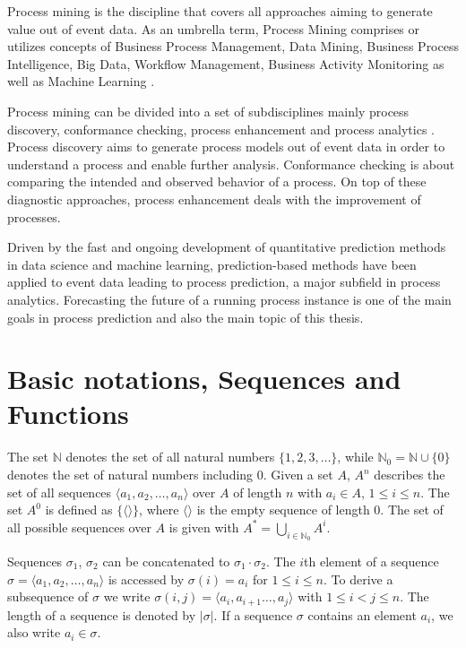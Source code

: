 Process mining is the discipline that covers all approaches aiming to generate value out of event data.
As an umbrella term, Process Mining comprises or utilizes concepts of Business Process Management, Data Mining, Business Process Intelligence, Big Data, Workflow Management, Business Activity Monitoring \cite{DBLP:books/sp/Aalst16} as well as Machine Learning \cite{DBLP:conf/bpm/VeitGMHT17}.

Process mining can be divided into a set of subdisciplines mainly process discovery, conformance checking, process enhancement and process analytics \cite{DBLP:conf/caise/EckLLA15}.
Process discovery aims to generate process models out of event data in order to understand a process and enable further analysis.
Conformance checking is about comparing the intended and observed behavior of a process. 
On top of these diagnostic approaches, process enhancement deals with the improvement of processes.

Driven by the fast and ongoing development of quantitative prediction methods in data science and machine learning, prediction-based methods have been applied to event data leading to process prediction, a major subfield in process analytics.
Forecasting the future of a running process instance is one of the main goals in process prediction and also the main topic of this thesis.


\section{Basic notations, Sequences and Functions}

The set $\mathbb{N}$ denotes the set of all natural numbers $\{1, 2, 3, \dots\}$, while $\mathbb{N}_0 = \mathbb{N} \cup \{0\}$ denotes the set of natural numbers including 0.
Given a set $A$, $A^n$ describes the set of all sequences $\langle a_1, a_2, \dots, a_n\rangle$ over $A$ of length $n$ with $a_i \in A$, $1 \leq i \leq n$.
The set $A^0$ is defined as $\{\langle \rangle\}$, where $\langle \rangle$ is the empty sequence of length $0$.
The set of all possible sequences over $A$ is given with $A^* = \bigcup\limits_{i\in \mathbb{N}_0} A^i$.

Sequences $\sigma_1$, $\sigma_2$ can be concatenated to $\sigma_1 \cdot \sigma_2$.
The $i$th element of a sequence $\sigma = \langle a_1, a_2, \dots, a_n\rangle$ is accessed by $\sigma(i)= a_i$ for $1 \leq i \leq n$.
To derive a subsequence of $\sigma$ we write $\sigma(i,j)=\langle a_i, a_{i+1} \dots, a_j\rangle$ with $1 \leq i < j \leq n$.
The length of a sequence is denoted by $|\sigma|$. If a sequence $\sigma$ contains an element $a_i$, we also write $a_i \in \sigma$.

